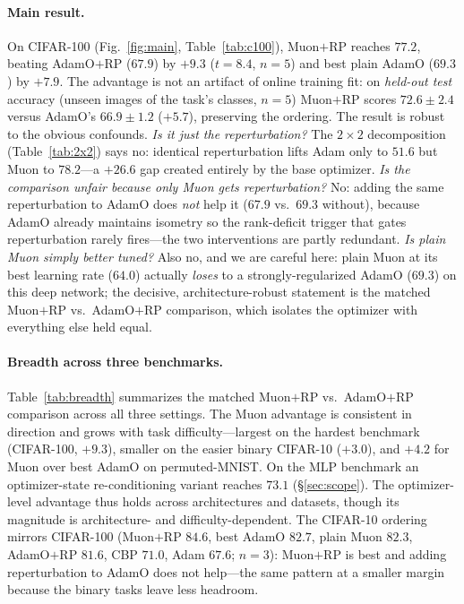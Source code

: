 \documentclass[letterpaper]{article} %
\begin{document}
\paragraph{Main result.} On CIFAR-100 (Fig.~\ref{fig:main}, Table~\ref{tab:c100}), Muon$+$RP reaches $77.2$, beating AdamO$+$RP ($67.9$) by $+9.3$ ($t{=}8.4$, $n{=}5$) and best plain AdamO ($69.3$) by $+7.9$. The advantage is not an artifact of online training fit: on \emph{held-out test} accuracy (unseen images of the task's classes, $n{=}5$) Muon$+$RP scores $72.6{\pm}2.4$ versus AdamO's $66.9{\pm}1.2$ ($+5.7$), preserving the ordering. The result is robust to the obvious confounds. \emph{Is it just the reperturbation?} The $2{\times}2$ decomposition (Table~\ref{tab:2x2}) says no: identical reperturbation lifts Adam only to $51.6$ but Muon to $78.2$---a $+26.6$ gap created entirely by the base optimizer. \emph{Is the comparison unfair because only Muon gets reperturbation?} No: adding the same reperturbation to AdamO does \emph{not} help it ($67.9$ vs.\ $69.3$ without), because AdamO already maintains isometry so the rank-deficit trigger that gates reperturbation rarely fires---the two interventions are partly redundant. \emph{Is plain Muon simply better tuned?} Also no, and we are careful here: plain Muon at its best learning rate ($64.0$) actually \emph{loses} to a strongly-regularized AdamO ($69.3$) on this deep network; the decisive, architecture-robust statement is the matched Muon$+$RP vs.\ AdamO$+$RP comparison, which isolates the optimizer with everything else held equal.

\paragraph{Breadth across three benchmarks.} Table~\ref{tab:breadth} summarizes the matched Muon$+$RP vs.\ AdamO$+$RP comparison across all three settings. The Muon advantage is consistent in direction and grows with task difficulty---largest on the hardest benchmark (CIFAR-100, $+9.3$), smaller on the easier binary CIFAR-10 ($+3.0$), and $+4.2$ for Muon over best AdamO on permuted-MNIST. On the MLP benchmark an optimizer-state re-conditioning variant reaches $73.1$ (\S\ref{sec:scope}). The optimizer-level advantage thus holds across architectures and datasets, though its magnitude is architecture- and difficulty-dependent. The CIFAR-10 ordering mirrors CIFAR-100 (Muon$+$RP $84.6$, best AdamO $82.7$, plain Muon $82.3$, AdamO$+$RP $81.6$, CBP $71.0$, Adam $67.6$; $n{=}3$): Muon$+$RP is best and adding reperturbation to AdamO does not help---the same pattern at a smaller margin because the binary tasks leave less headroom.
\end{document}
